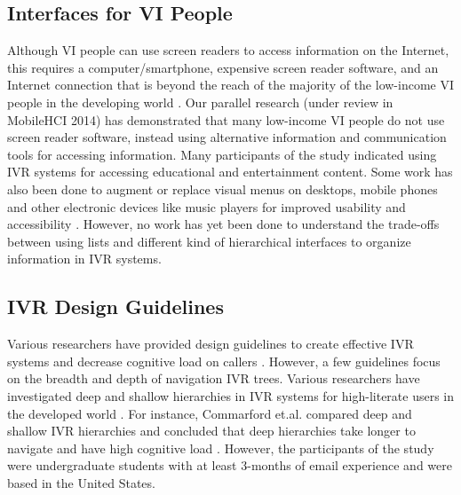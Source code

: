 \documentclass{sigchi}
\begin{document}
\subsection{Interfaces for VI People}
Although VI people can use screen readers to access information on the Internet, this requires a computer/smartphone, expensive screen reader software, and an Internet connection that is beyond the reach of the majority of the low-income VI people in the developing world \cite{McCarthy2012}. Our parallel research (under review in MobileHCI 2014) has demonstrated that many low-income VI people do not use screen reader software, instead using alternative information and communication tools for accessing information. Many participants of the study indicated using IVR systems for accessing educational and entertainment content. Some work has also been done to augment or replace visual menus on desktops, mobile phones and other electronic devices like music players for improved usability and accessibility \cite{Yalla2008,Zhao2007,Jeon2012}. However, no work has yet been done to understand the trade-offs between using lists and different kind of hierarchical interfaces to organize information in IVR systems.

\subsection{IVR Design Guidelines}
Various researchers have provided design guidelines to create effective IVR systems and decrease cognitive load on callers	 \cite{Ndwe2008,Suhm2008,MSDNSpeech,Halstead-Nussloch1989}. However, a few guidelines focus on the breadth and depth of navigation IVR trees. Various researchers have investigated deep and shallow hierarchies in IVR systems for high-literate users in the developed world \cite{Huguenard1997,Virzi1997,Commarford2008}. For instance, Commarford et.al. compared deep and shallow IVR hierarchies and concluded that deep hierarchies take longer to navigate and have high cognitive load \cite{Commarford2008}. However, the participants of the study were undergraduate students with at least 3-months of email experience and were based in the United States. 
\end{document}

